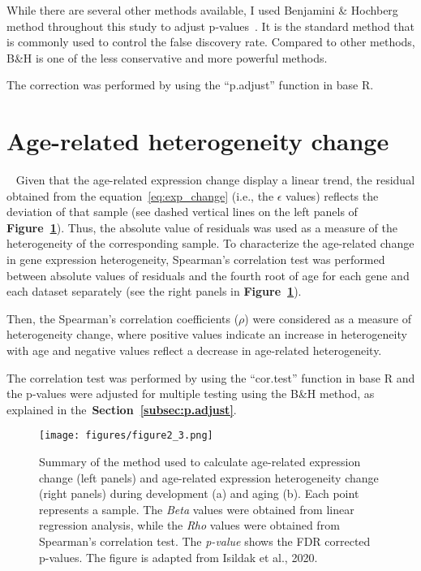 While there are several other methods available, I used Benjamini {\&} Hochberg method throughout this study to adjust p-values~\cite{Benjamini1995}.
It is the standard method that is commonly used to control the false discovery rate. 
Compared to other methods, B{\&}H is one of the less conservative and more powerful methods.

The correction was performed by using the ``p.adjust'' function in base R.

\section{Age-related heterogeneity change}~\label{sec:het-change}
Given that the age-related expression change display a linear trend, the residual obtained from the equation~\ref{eq:exp_change} (i.e., the $\epsilon$ values)
reflects the deviation of that sample (see dashed vertical lines on the left panels of \textbf{Figure~\ref{fig:fig2.3}}).
Thus, the absolute value of residuals was used as a measure of the heterogeneity of the corresponding sample. 
To characterize the age-related change in gene expression heterogeneity,
Spearman's correlation test was performed between absolute values of residuals and the fourth root of age for each gene and each dataset separately (see the right panels in \textbf{Figure~\ref{fig:fig2.3}}).

Then, the Spearman's correlation coefficients ($\rho$) were considered as a measure of heterogeneity change, 
where positive values indicate an increase in heterogeneity with age and negative values reflect a decrease in age-related heterogeneity. 

The correlation test was performed by using the ``cor.test'' function in base R and the p-values were adjusted for multiple testing using the B{\&}H method, 
as explained in the~\textbf{Section~\ref{subsec:p.adjust}}.

\begin{figure}[h]
\centering
\texttt{[image: figures/figure2\_3.png]}
\caption{Summary of the method used to calculate age-related expression change (left panels) 
and age-related expression heterogeneity change (right panels) during development (a) and aging (b). 
Each point represents a sample.
The \textit{Beta} values were obtained from linear regression analysis, while the \textit{Rho} values were obtained from Spearman's correlation test. 
The \textit{p-value} shows the FDR corrected p-values. 
The figure is adapted from Isildak et al., 2020.}\label{fig:fig2.3}
\end{figure}

